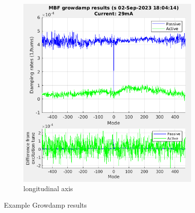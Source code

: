 \documentclass{report}
\begin{document}
\begin{figure}[hbt]
    \begin{subfigure}[b]{0.45\textwidth}
        \includegraphics[width=\textwidth]{vlr_growdamp_s.png}
        \caption{longitudinal axis}
        \label{fig:growdamp_example_z}
    \end{subfigure}
    \caption{Example Growdamp results}
    \label{fig:growdamp_example}
\end{figure}
\end{document}

